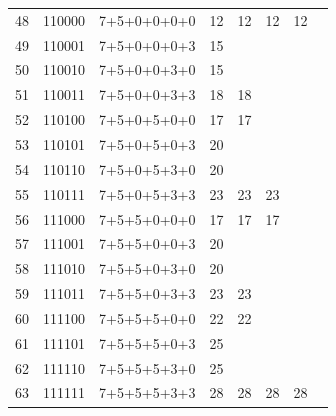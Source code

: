 \documentclass[12pt]{extarticle}
\begin{document}
 \begin{center}
\begin{tabular}{ | m{1.5cm} | m{1.7cm} | m{3cm} | m{1.2cm} | m{1.3cm} | m{1.3cm} | m{1.5cm} | m{1.5cm} |}
\cline{1-7}
 48 & 110000 & 7+5+0+0+0+0 & 12 &                     12 & 12                 & 12                 &\\
 \cline{1-4}
 49 & 110001 & 7+5+0+0+0+3 & 15 & \multirow{2}{*}{ }     & \multirow{6}{*}{ } & \multirow{14}{*}{} & \multirow{30}{*}{}\\
 \cline{1-4}
 50 & 110010 & 7+5+0+0+3+0 & 15 &                        &                    &                    &\\
 \cline{1-4}
 51 & 110011 & 7+5+0+0+3+3 & 18 &                     18 &                    &                    &\\
 \cline{1-5}
 52 & 110100 & 7+5+0+5+0+0 & 17 &                     17 &                    &                    &\\
 \cline{1-4}
 53 & 110101 & 7+5+0+5+0+3 & 20 & \multirow{2}{*}{ }     &                    &                    &\\
 \cline{1-4}
 54 & 110110 & 7+5+0+5+3+0 & 20 &                        &                    &                    &\\
 \cline{1-4}
 55 & 110111 & 7+5+0+5+3+3 & 23 &                     23 & 23                 &                    &\\
 \cline{1-6}

 56 & 111000 & 7+5+5+0+0+0 & 17 &                     17 & 17                 &                    &\\
 \cline{1-4}
 57 & 111001 & 7+5+5+0+0+3 & 20 & \multirow{2}{*}{ }     & \multirow{6}{*}{ } &                    &\\
 \cline{1-4}
 58 & 111010 & 7+5+5+0+3+0 & 20 &                        &                    &                    &\\
 \cline{1-4}
 59 & 111011 & 7+5+5+0+3+3 & 23 &                     23 &                    &                    &\\
 \cline{1-5}
 60 & 111100 & 7+5+5+5+0+0 & 22 &                     22 &                    &                    &\\
 \cline{1-4}
 61 & 111101 & 7+5+5+5+0+3 & 25 & \multirow{2}{*}{ }     &                    &                    &\\
 \cline{1-4}
 62 & 111110 & 7+5+5+5+3+0 & 25 &                        &                    &                    &\\
 \cline{1-4}
 63 & 111111 & 7+5+5+5+3+3 & 28 &                     28 & 28                 & 28                 & 28\\
 \cline{1-8}

 
 \end{tabular}
 \end{center}
\end{document}
